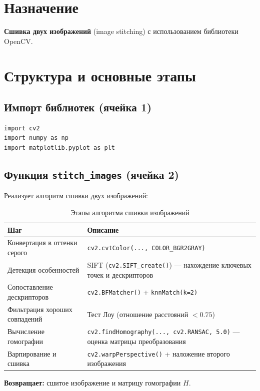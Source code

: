 \documentclass[a4paper,14pt]{extarticle}
\begin{document}
\section{Назначение}
\textbf{Сшивка двух изображений} (image stitching) с использованием библиотеки OpenCV.

\section{Структура и основные этапы}

\subsection{Импорт библиотек (ячейка 1)}
\begin{lstlisting}
import cv2
import numpy as np
import matplotlib.pyplot as plt
\end{lstlisting}

\subsection{Функция \texttt{stitch\_images} (ячейка 2)}
Реализует алгоритм сшивки двух изображений:

\begin{table}[h]
\centering
\renewcommand{\arraystretch}{1.3} %
\begin{tabularx}{\textwidth}{|l|X|}
\hline
\textbf{Шаг} & \textbf{Описание} \\
\hline
Конвертация в оттенки серого &
\texttt{cv2.cvtColor(..., COLOR\_BGR2GRAY)} \\
\hline
Детекция особенностей & SIFT (\texttt{cv2.SIFT\_create()}) — нахождение ключевых точек и дескрипторов \\
\hline
Сопоставление дескрипторов & \texttt{cv2.BFMatcher()} + \texttt{knnMatch(k=2)} \\
\hline
Фильтрация хороших совпадений &
Тест Лоу (отношение расстояний $< 0.75$) \\
\hline
Вычисление гомографии & \texttt{cv2.findHomography(..., cv2.RANSAC, 5.0)} — оценка матрицы преобразования \\
\hline
Варпирование и сшивка & \texttt{cv2.warpPerspective()} + наложение второго изображения \\
\hline
\end{tabularx}
\caption{Этапы алгоритма сшивки изображений}
\end{table}

\textbf{Возвращает:} сшитое изображение и матрицу гомографии $H$.
\end{document}
